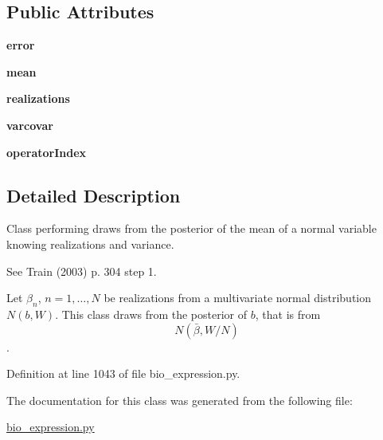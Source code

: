\subsection*{Public Attributes}
\begin{DoxyCompactItemize}
\item 
{\bfseries error}\hypertarget{classbio__expression_1_1bio_bayes_normal_draw_a30b0bf4a22a9cb18339f80fac27c7a94}{}\label{classbio__expression_1_1bio_bayes_normal_draw_a30b0bf4a22a9cb18339f80fac27c7a94}

\item 
{\bfseries mean}\hypertarget{classbio__expression_1_1bio_bayes_normal_draw_a753389533e490c43d924c3885bf7be59}{}\label{classbio__expression_1_1bio_bayes_normal_draw_a753389533e490c43d924c3885bf7be59}

\item 
{\bfseries realizations}\hypertarget{classbio__expression_1_1bio_bayes_normal_draw_a114f339f8620e3a99143c5012edb9878}{}\label{classbio__expression_1_1bio_bayes_normal_draw_a114f339f8620e3a99143c5012edb9878}

\item 
{\bfseries varcovar}\hypertarget{classbio__expression_1_1bio_bayes_normal_draw_ae7e9d848ba62ec07f1a10e301ebfcb8a}{}\label{classbio__expression_1_1bio_bayes_normal_draw_ae7e9d848ba62ec07f1a10e301ebfcb8a}

\item 
{\bfseries operator\+Index}\hypertarget{classbio__expression_1_1bio_bayes_normal_draw_a3f4f5dd2af4e503c67ed20f9ddf8809b}{}\label{classbio__expression_1_1bio_bayes_normal_draw_a3f4f5dd2af4e503c67ed20f9ddf8809b}

\end{DoxyCompactItemize}


\subsection{Detailed Description}
Class performing draws from the posterior of the mean of a normal variable knowing realizations and variance. 

See Train (2003) p. 304 step 1.

Let $\beta_n$, $n=1,\ldots,N$ be realizations from a multivariate normal distribution $N(b,W)$. This class draws from the posterior of $b$, that is from \[ N(\bar{\beta},W/N) \]. 

Definition at line 1043 of file bio\+\_\+expression.\+py.



The documentation for this class was generated from the following file\+:\begin{DoxyCompactItemize}
\item 
\hyperlink{bio__expression_8py}{bio\+\_\+expression.\+py}\end{DoxyCompactItemize}
